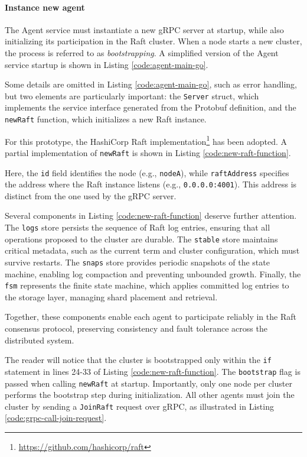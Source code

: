 \paragraph{Instance new agent}

The Agent service must instantiate a new gRPC server at startup, while also initializing its participation in the Raft cluster. When a node starts a new cluster, the process is referred to as \emph{bootstrapping}. A simplified version of the Agent service startup is shown in Listing \ref{code:agent-main-go}.

Some details are omitted in Listing \ref{code:agent-main-go}, such as error handling, but two elements are particularly important:
the \texttt{Server} struct, which implements the service interface generated from the Protobuf definition, and the \texttt{newRaft} function, which initializes a new Raft instance.  

For this prototype, the HashiCorp Raft implementation\footnote{\url{https://github.com/hashicorp/raft}} has been adopted. A partial implementation of \texttt{newRaft} is shown in Listing \ref{code:new-raft-function}.

Here, the \texttt{id} field identifies the node (e.g., \texttt{nodeA}), while \texttt{raftAddress} specifies the address where the Raft instance listens (e.g., \texttt{0.0.0.0:4001}). This address is distinct from the one used by the gRPC server.

Several components in Listing \ref{code:new-raft-function} deserve further attention.  
The \texttt{logs} store persists the sequence of Raft log entries, ensuring that all operations proposed to the cluster are durable. The \texttt{stable} store maintains critical metadata, such as the current term and cluster configuration, which must survive restarts. The \texttt{snaps} store provides periodic snapshots of the state machine, enabling log compaction and preventing unbounded growth. Finally, the \texttt{fsm} represents the finite state machine, which applies committed log entries to the storage layer, managing shard placement and retrieval.  

Together, these components enable each agent to participate reliably in the Raft consensus protocol, preserving consistency and fault tolerance across the distributed system.

The reader will notice that the cluster is bootstrapped only within the
\texttt{if} statement in lines 24-33 of Listing \ref{code:new-raft-function}.
The \texttt{bootstrap} flag is passed when calling \texttt{newRaft} at startup.
Importantly, only one node per cluster performs the bootstrap step during
initialization. All other agents must join the cluster by sending a \texttt{JoinRaft} request over gRPC, as illustrated in Listing \ref{code:grpc-call-join-request}.

